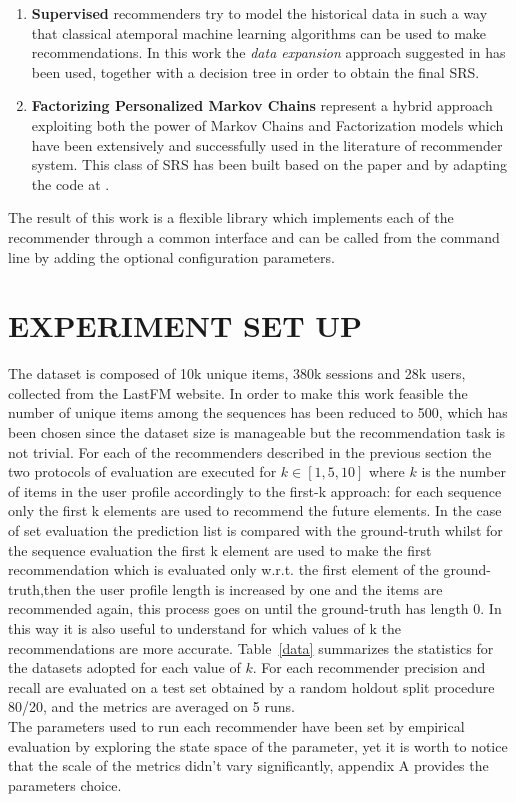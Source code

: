 \documentclass[prodmode,acmtecs]{acmsmall} %
\begin{document}
\begin{enumerate}
	\item \textbf{Supervised} recommenders try to model the historical data in such a way that classical atemporal machine learning algorithms can be used to make recommendations. In this work the \textit{data expansion} approach suggested in \cite{zidmars01temporal} has been used, together with a decision tree in order to obtain the final SRS.
	\item \textbf{Factorizing Personalized Markov Chains} represent a hybrid approach exploiting both the power of Markov Chains and Factorization models which have been extensively and successfully used in the literature of recommender system. This class of SRS has been built based on the paper\cite{rendle10FPMC} and by adapting the code at \cite{fpmcLib}.
\end{enumerate}
	The result of this work is a flexible library\cite{srsLib} which implements each of the recommender through a common interface and can be called from the command line by adding the optional configuration parameters.

\section{EXPERIMENT SET UP}
The dataset is composed of 10k unique items, 380k sessions and 28k users, collected from the LastFM website. In order to make this work feasible the number of unique items among the sequences has been reduced to 500, which has been chosen since the dataset size is manageable but the recommendation task is not trivial.
For each of the recommenders described in the previous section the two protocols of evaluation are executed for $k \in [1,5,10]$ where $k$ is the number of items in the user profile accordingly to the first-k approach: for each sequence only the first k elements are used to recommend the future elements. In the case of set evaluation the prediction list is compared with the ground-truth whilst for the sequence evaluation the first k element are used to make the first recommendation which is evaluated only w.r.t. the first element of the ground-truth,then the user profile length is increased by one and the items are recommended again, this process goes on until the ground-truth has length 0. In this way it is also useful to understand for which values of k the recommendations are more accurate.
Table~\ref{data} summarizes the statistics for the datasets adopted for each value of $k$.
For each recommender precision and recall are evaluated on a test set obtained by a random holdout split procedure 80/20, and the metrics are averaged on 5 runs.\\ The parameters used to run each recommender have been set by empirical evaluation by exploring the state space of the parameter, yet it is worth to notice that the scale of the metrics didn't vary significantly, appendix A provides the parameters choice.
\end{document}
